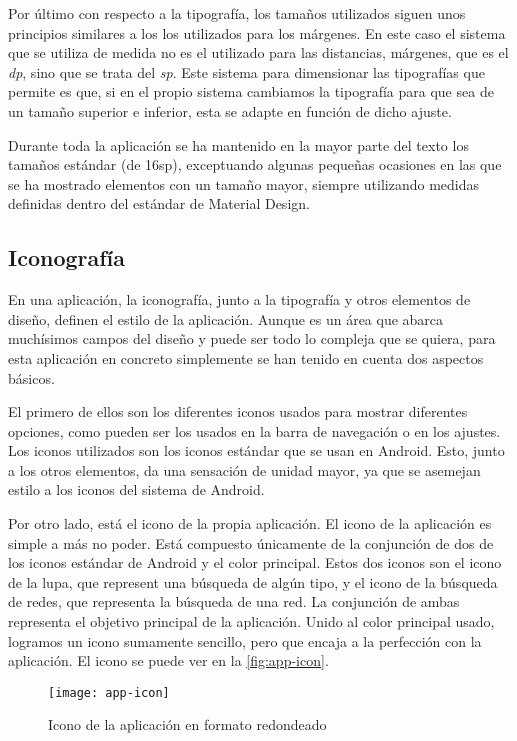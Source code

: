 Por último con respecto a la tipografía, los tamaños utilizados siguen unos principios similares a los los utilizados para los márgenes. En este caso el sistema que se utiliza de medida no es el utilizado para las distancias, márgenes, que es el \textit{dp}, sino que se trata del \textit{sp}. Este sistema para dimensionar las tipografías que permite es que, si en el propio sistema cambiamos la tipografía para que sea de un tamaño superior e inferior, esta se adapte en función de dicho ajuste.

Durante toda la aplicación se ha mantenido en la mayor parte del texto los tamaños estándar (de 16sp), exceptuando algunas pequeñas ocasiones en las que se ha mostrado elementos con un tamaño mayor, siempre utilizando medidas definidas dentro del estándar de Material Design.

\subsection{Iconografía}

En una aplicación, la iconografía, junto a la tipografía y otros elementos de diseño, definen el estilo de la aplicación. Aunque es un área que abarca muchísimos campos del diseño y puede ser todo lo compleja que se quiera, para esta aplicación en concreto simplemente se han tenido en cuenta dos aspectos básicos.

El primero de ellos son los diferentes iconos usados para mostrar diferentes opciones, como pueden ser los usados en la barra de navegación o en los ajustes. Los iconos utilizados son los iconos estándar que se usan en Android. Esto, junto a los otros elementos, da una sensación de unidad mayor, ya que se asemejan estilo a los iconos del sistema de Android.

Por otro lado, está el icono de la propia aplicación. El icono de la aplicación es simple a más no poder. Está compuesto únicamente de la conjunción de dos de los iconos estándar de Android y el color principal. Estos dos iconos son el icono de la lupa, que represent una búsqueda de algún tipo, y el icono de la búsqueda de redes, que representa la búsqueda de una red. La conjunción de ambas representa el objetivo principal de la aplicación. Unido al color principal usado, logramos un icono sumamente sencillo, pero que encaja a la perfección con la aplicación. El icono se puede ver en la \autoref{fig:app-icon}.

\begin{figure}[H]
	\centering
	\texttt{[image: app-icon]}
	\caption{Icono de la aplicación en formato redondeado}
	\label{fig:app-icon}
\end{figure}

